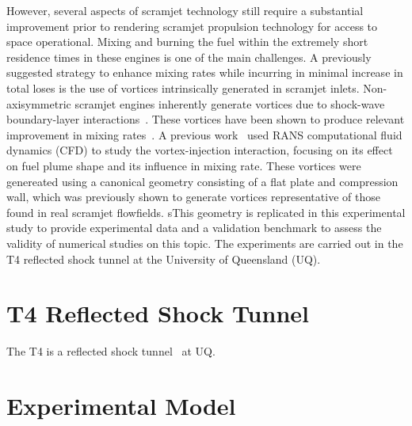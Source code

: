 \documentclass{AIAA}
\begin{document}
However, several aspects of scramjet technology still require a substantial improvement prior to rendering scramjet propulsion technology for access to space operational.
Mixing and burning the fuel within the extremely short residence times in these engines is one of the main challenges.
A previously suggested strategy to enhance mixing rates while incurring in minimal increase in total loses is the use of vortices intrinsically generated in scramjet inlets.
Non-axisymmetric scramjet engines inherently generate vortices due to shock-wave boundary-layer interactions~\cite{Alvi}. 
These vortices have been shown to produce relevant improvement in mixing rates~\cite{SpacePlanes_paper2015,Llobet_PlumeElongation}.
A previous work~\cite{Llobet_PlumeElongation} used RANS computational fluid dynamics (CFD) to study the vortex-injection interaction, focusing on its effect on fuel plume shape and its influence in mixing rate. 
These vortices were genereated using a canonical geometry consisting of a flat plate and compression wall, which was previously shown to generate vortices representative of those found in real scramjet flowfields.
sThis geometry is replicated in this experimental study to provide experimental data and a validation benchmark to assess the validity of numerical studies on this topic.
The experiments are carried out in the T4 reflected shock tunnel at the University of Queensland (UQ).

\section{T4 Reflected Shock Tunnel}
	\label{sec:T4Literature}
	
The T4 is a reflected shock tunnel~\cite{Stalker1965} at UQ.
%


\section{Experimental Model}
	\label{sec:ModelDescription}
	
\end{document}

